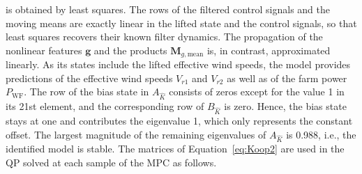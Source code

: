 is obtained by least squares. The rows of the filtered control signals and the moving means are exactly linear in the lifted state and the control signals, so that least squares recovers their known filter dynamics. The propagation of the nonlinear features $\bm{g}$ and the products $\bm{M}_{g,\text{mean}}$ is, in contrast, approximated linearly. As its states include the lifted effective wind speeds, the model provides predictions of the effective wind speeds $V_{r1}$ and $V_{r2}$ as well as of the farm power $P_{\text{WF}}$. The row of the bias state in $A_{\hat{K}}$ consists of zeros except for the value 1 in its 21st element, and the corresponding row of $B_{\hat{K}}$ is zero. Hence, the bias state stays at one and contributes the eigenvalue 1, which only represents the constant offset. The largest magnitude of the remaining eigenvalues of $A_{\hat{K}}$ is 0.988, i.e., the identified model is stable.
The matrices of Equation~\eqref{eq:Koop2} are used in the QP solved at each sample of the MPC as follows.



%




